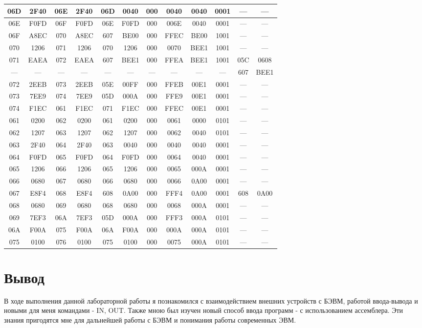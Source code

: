 \begin{center}
\begin{tabular}{|c|c|c|c|c|c|c|c|c|c|c|c|}
\hline
06D & 2F40 & 06E & 2F40 & 06D & 0040 & 000 & 0040 & 0040 & 0001 & --- & ---\\
\hline
06E & F0FD & 06F & F0FD & 06E & F0FD & 000 & 006E & 0040 & 0001 & --- & ---\\
\hline
06F & A8EC & 070 & A8EC & 607 & BE00 & 000 & FFEC & BE00 & 1001 & --- & ---\\
\hline
070 & 1206 & 071 & 1206 & 070 & 1206 & 000 & 0070 & BEE1 & 1001 & --- & ---\\
\hline
071 & EAEA & 072 & EAEA & 607 & BEE1 & 000 & FFEA & BEE1 & 1001 & 05C & 0608\\
\hline
--- & --- & --- & --- & --- & --- & --- & --- & --- & --- & 607 & BEE1\\
\hline
072 & 2EEB & 073 & 2EEB & 05E & 00FF & 000 & FFEB & 00E1 & 0001 & --- & ---\\
\hline
073 & 7EE9 & 074 & 7EE9 & 05D & 000A & 000 & FFE9 & 00E1 & 0001 & --- & ---\\
\hline
074 & F1EC & 061 & F1EC & 071 & F1EC & 000 & FFEC & 00E1 & 0001 & --- & ---\\
\hline
061 & 0200 & 062 & 0200 & 061 & 0200 & 000 & 0061 & 0000 & 0101 & --- & ---\\
\hline
062 & 1207 & 063 & 1207 & 062 & 1207 & 000 & 0062 & 0040 & 0101 & --- & ---\\
\hline
063 & 2F40 & 064 & 2F40 & 063 & 0040 & 000 & 0040 & 0040 & 0001 & --- & ---\\
\hline
064 & F0FD & 065 & F0FD & 064 & F0FD & 000 & 0064 & 0040 & 0001 & --- & ---\\
\hline
065 & 1206 & 066 & 1206 & 065 & 1206 & 000 & 0065 & 000A & 0001 & --- & ---\\
\hline
066 & 0680 & 067 & 0680 & 066 & 0680 & 000 & 0066 & 0A00 & 0001 & --- & ---\\
\hline
067 & E8F4 & 068 & E8F4 & 608 & 0A00 & 000 & FFF4 & 0A00 & 0001 & 608 & 0A00\\
\hline
068 & 0680 & 069 & 0680 & 068 & 0680 & 000 & 0068 & 000A & 0001 & --- & ---\\
\hline
069 & 7EF3 & 06A & 7EF3 & 05D & 000A & 000 & FFF3 & 000A & 0101 & --- & ---\\
\hline
06A & F00A & 075 & F00A & 06A & F00A & 000 & 000A & 000A & 0101 & --- & ---\\
\hline
075 & 0100 & 076 & 0100 & 075 & 0100 & 000 & 0075 & 000A & 0101 & --- & ---\\
\hline
\end{tabular}
\end{center}

\section{Вывод}
В ходе выполнения данной лабораторной работы я познакомился с взаимодействием внешних устройств с БЭВМ, работой ввода-вывода и новыми для меня командами - IN, OUT. Также мною был изучен новый способ ввода программ - с использованием ассемблера. Эти знания пригодятся мне для дальнейшей работы с БЭВМ и понимания работы современных ЭВМ.
